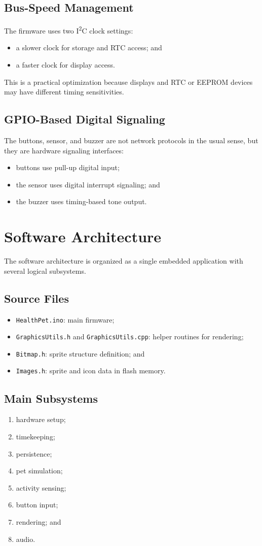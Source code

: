 \documentclass[conference]{IEEEtran}
\begin{document}
\subsection{Bus-Speed Management}
The firmware uses two I\textsuperscript{2}C clock settings:
\begin{itemize}
\item a slower clock for storage and RTC access; and
\item a faster clock for display access.
\end{itemize}
This is a practical optimization because displays and RTC or EEPROM devices may have different timing sensitivities.

\subsection{GPIO-Based Digital Signaling}
The buttons, sensor, and buzzer are not network protocols in the usual sense, but they are hardware signaling interfaces:
\begin{itemize}
\item buttons use pull-up digital input;
\item the sensor uses digital interrupt signaling; and
\item the buzzer uses timing-based tone output.
\end{itemize}

\section{Software Architecture}
The software architecture is organized as a single embedded application with several logical subsystems.

\subsection{Source Files}
\begin{itemize}
\item \texttt{HealthPet.ino}: main firmware;
\item \texttt{GraphicsUtils.h} and \texttt{GraphicsUtils.cpp}: helper routines for rendering;
\item \texttt{Bitmap.h}: sprite structure definition; and
\item \texttt{Images.h}: sprite and icon data in flash memory.
\end{itemize}

\subsection{Main Subsystems}
\begin{enumerate}
\item hardware setup;
\item timekeeping;
\item persistence;
\item pet simulation;
\item activity sensing;
\item button input;
\item rendering; and
\item audio.
\end{enumerate}
\end{document}
